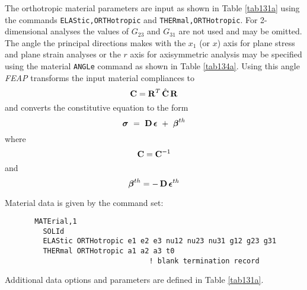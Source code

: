 The orthotropic material parameters are input as shown in Table \ref{tab131a}
using the commands {\tt ELAStic,ORTHotropic} and {\tt THERmal,ORTHotropic}.
For 2-dimensional analyses the values of $G_{23}$ and $G_{31}$ are not used
and may be omitted.
The angle the principal directions makes with the $x_1$ (or $x$)
axis for plane stress
and plane strain analyses or the $r$ axis for axisymmetric analysis may be
specified using the material {\tt ANGLe} command
as shown in Table \ref{tab134a}.
Using this angle {\sl FEAP} transforms the input material compliances to
\begin{equation}
\mathbf{C} = \mathbf{R}^T \, \hat{\mathbf{C}} \, \mathbf{R}
\end{equation}
and converts the constitutive equation to the form
\begin{equation}
\boldsymbol{\sigma} ~=~ \mathbf{D} \, \boldsymbol{\epsilon} ~+~ {\boldsymbol{\beta}}^{th}
\end{equation}
where
\begin{equation}
\mathbf{C} = \mathbf{C}^{-1}
\end{equation}
and
\begin{equation}
{\boldsymbol{\beta}}^{th} = - \, \mathbf{D} \, {\boldsymbol{\epsilon}}^{th}
\end{equation}

Material data is given by the command set:
\begin{verbatim}
       MATErial,1
         SOLId
         ELAStic ORTHotropic e1 e2 e3 nu12 nu23 nu31 g12 g23 g31
         THERmal ORTHotropic a1 a2 a3 t0
                                  ! blank termination record
\end{verbatim}
Additional data options and parameters are defined in Table \ref{tab131a}.

